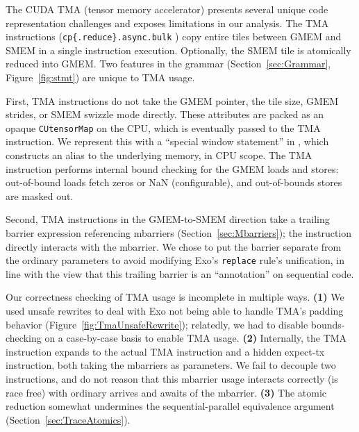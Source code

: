 
The CUDA TMA (tensor memory accelerator) presents several unique code representation challenges and exposes limitations in our analysis.
The TMA instructions (\texttt{cp\{.reduce\}.async.bulk} \cite{ptx})
copy entire tiles between GMEM and SMEM in a single instruction execution.
Optionally, the SMEM tile is atomically reduced into GMEM.
Two features in the grammar (Section~\ref{sec:Grammar}, Figure~\ref{fig:stmt}) are unique to TMA usage.

First, TMA instructions do not take the GMEM pointer, the tile size, GMEM strides, or SMEM swizzle mode directly.
These attributes are packed as an opaque \texttt{CUtensorMap} on the CPU,
which is eventually passed to the TMA instruction.
We represent this with a ``special window statement'' in \sporkName{},
which constructs an alias to the underlying memory, in CPU scope.
The TMA instruction performs internal bound checking for the GMEM loads and stores:
out-of-bound loads fetch zeros or NaN (configurable), and out-of-bounds stores are masked out.

Second, TMA instructions in the GMEM-to-SMEM direction take a trailing barrier expression
referencing mbarriers (Section~\ref{sec:Mbarriers});
the instruction directly interacts with the mbarrier.
We chose to put the barrier separate from the ordinary parameters
to avoid modifying Exo's \texttt{replace} rule's unification,
in line with the view that this trailing barrier is an ``annotation'' on sequential code.

Our correctness checking of TMA usage is incomplete in multiple ways.
\textbf{(1)} We used unsafe rewrites to deal with Exo not being able to handle TMA's padding behavior
(Figure~\ref{fig:TmaUnsafeRewrite});
relatedly, we had to disable bounds-checking on a case-by-case basis to enable TMA usage.
\textbf{(2)} Internally, the \sporkName{} TMA instruction expands to the actual TMA instruction and a hidden expect-tx instruction, both taking the mbarriers as parameters.
We fail to decouple two instructions,
and do not reason that this mbarrier usage interacts correctly (is race free) with ordinary arrives and awaits of the mbarrier.
\textbf{(3)} The atomic reduction somewhat undermines the sequential-parallel equivalence argument (Section~\ref{sec:TraceAtomics}).


